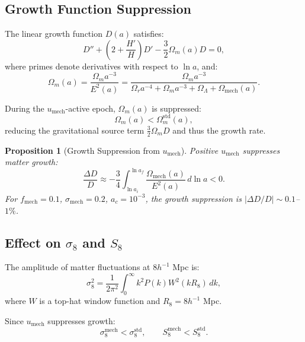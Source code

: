 \documentclass[11pt,a4paper]{article}
\newcommand{\umech}{\ensuremath{u_{\mathrm{mech}}}}
\newcommand{\fmech}{\ensuremath{f_{\mathrm{mech}}}}
\newcommand{\ac}{\ensuremath{a_c}}
\newcommand{\sigmamech}{\ensuremath{\sigma_{\mathrm{mech}}}}
\newcommand{\Omm}{\ensuremath{\Omega_m}}
\newcommand{\Omr}{\ensuremath{\Omega_r}}
\newcommand{\OmL}{\ensuremath{\Omega_\Lambda}}
\newtheorem{proposition}[theorem]{Proposition}
\theoremstyle{definition}
\theoremstyle{remark}
\begin{document}
\subsection{Growth Function Suppression}
\label{sec:growth_function}

The linear growth function $D(a)$ satisfies:
\begin{equation}
\label{eq:growth_ODE}
D'' + \left(2 + \frac{H'}{H}\right)D' - \frac{3}{2}\Omega_m(a) D = 0,
\end{equation}
where primes denote derivatives with respect to $\ln a$, and:
\begin{equation}
\Omega_m(a) = \frac{\Omm a^{-3}}{E^2(a)} = \frac{\Omm a^{-3}}{\Omr a^{-4} + \Omm a^{-3} + \OmL + \Omega_{\mathrm{mech}}(a)}.
\end{equation}

During the $\umech$-active epoch, $\Omega_m(a)$ is suppressed:
\begin{equation}
\Omega_m(a) < \Omega_m^{\mathrm{std}}(a),
\end{equation}
reducing the gravitational source term $\frac{3}{2}\Omega_m D$ and thus the growth rate.

\begin{proposition}[Growth Suppression from $\umech$]
\label{prop:growth_suppression}
Positive $\umech$ suppresses matter growth:
\begin{equation}
\boxed{\frac{\Delta D}{D} \approx -\frac{3}{4}\int_{\ln a_i}^{\ln a_f} \frac{\Omega_{\mathrm{mech}}(a)}{E^2(a)} \, d\ln a < 0.}
\end{equation}
For $\fmech = 0.1$, $\sigmamech = 0.2$, $\ac = 10^{-3}$, the growth suppression is $|\Delta D/D| \sim 0.1$--$1\%$.
\end{proposition}

\subsection{Effect on $\sigma_8$ and $S_8$}
\label{sec:sigma8}

The amplitude of matter fluctuations at $8h^{-1}$ Mpc is:
\begin{equation}
\sigma_8^2 = \frac{1}{2\pi^2}\int_0^\infty k^2 P(k) W^2(kR_8) \, dk,
\end{equation}
where $W$ is a top-hat window function and $R_8 = 8h^{-1}$ Mpc.

Since $\umech$ suppresses growth:
\begin{equation}
\sigma_8^{\mathrm{mech}} < \sigma_8^{\mathrm{std}}, \qquad S_8^{\mathrm{mech}} < S_8^{\mathrm{std}}.
\end{equation}
\end{document}
